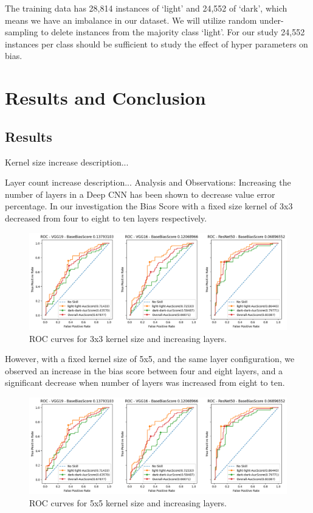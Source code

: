 \documentclass[conference]{IEEEtran}
\begin{document}
The training data has 28,814 instances of ‘light’ and 24,552 of ‘dark’, which means we have an imbalance in our dataset. We will utilize random under-sampling to delete instances from the majority class ‘light’. For our study 24,552 instances per class should be sufficient to study the effect of hyper parameters on bias.

\section{Results and Conclusion}
\subsection{Results}
Kernel size increase description...

Layer count increase description...
Analysis and Observations:
Increasing the number of layers in a Deep CNN has been shown to decrease value error percentage\cite{simonyan2014very}. 
In our investigation the Bias Score with a fixed size kernel of 3x3 decreased from four to eight to ten layers respectively.

\begin{figure}[hbt!]
    \centerline{\includegraphics[width=0.8\linewidth]{latex/images/VGG19_VGG16_ResNet50.png}}
    \caption{ROC curves for 3x3 kernel size and increasing layers.}
    \label{binarized_data}
\end{figure}

However, with a fixed kernel size of 5x5, and the same layer configuration, we observed an increase in the bias score between four and eight layers, and a significant decrease when number of layers was increased from eight to ten.

\begin{figure}[hbt!]
    \centerline{\includegraphics[width=1\linewidth]{latex/images/VGG19_VGG16_ResNet50.png}}
    \caption{ROC curves for 5x5 kernel size and increasing layers.}
    \label{binarized_data}
\end{figure}
\end{document}

